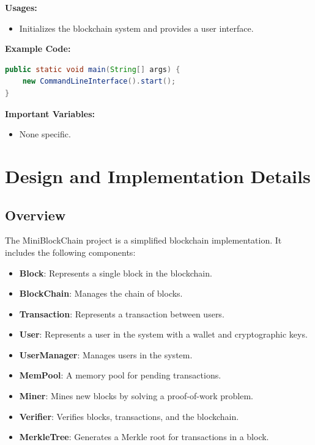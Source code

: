 \documentclass[12pt]{article}
\begin{document}
\textbf{Usages:}
\begin{itemize}
    \item Initializes the blockchain system and provides a user interface.
\end{itemize}

\textbf{Example Code:}
\begin{lstlisting}[language=Java]
public static void main(String[] args) {
    new CommandLineInterface().start();
}
\end{lstlisting}

\textbf{Important Variables:}
\begin{itemize}
    \item None specific.
\end{itemize}

\section{Design and Implementation Details}

\subsection{Overview}
The MiniBlockChain project is a simplified blockchain implementation. It includes the following components:
\begin{itemize}
    \item \textbf{Block}: Represents a single block in the blockchain.
    \item \textbf{BlockChain}: Manages the chain of blocks.
    \item \textbf{Transaction}: Represents a transaction between users.
    \item \textbf{User}: Represents a user in the system with a wallet and cryptographic keys.
    \item \textbf{UserManager}: Manages users in the system.
    \item \textbf{MemPool}: A memory pool for pending transactions.
    \item \textbf{Miner}: Mines new blocks by solving a proof-of-work problem.
    \item \textbf{Verifier}: Verifies blocks, transactions, and the blockchain.
    \item \textbf{MerkleTree}: Generates a Merkle root for transactions in a block.
\end{itemize}
\end{document}
